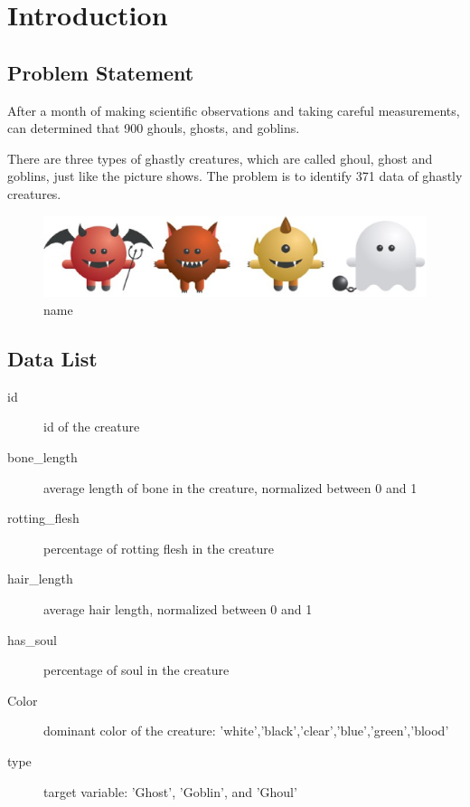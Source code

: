 
\section{Introduction}\label{sec-intro}

\subsection{Problem Statement}
After a month of making scientific observations 
and taking careful measurements, 
can determined that 900 ghouls, ghosts, and goblins.



There are three types of ghastly creatures, which are called ghoul, ghost and goblins, just like the picture shows. The problem is to identify 371 data of ghastly creatures. 


\begin{figure}[htbp]\centering
	\includegraphics[scale=0.3]{figures/bar.eps}
	\caption{name}
\end{figure}


\subsection{Data List}

\begin{description}
	\item[id] id of the creature
	\item[bone_length] average length of bone in the creature, normalized between 0 and 1
	\item[rotting_flesh] percentage of rotting flesh in the creature
	\item[hair_length] average hair length, normalized between 0 and 1
	\item[has_soul] percentage of soul in the creature
	\item[Color] dominant color of the creature: 'white','black','clear','blue','green','blood'
	\item[type] target variable: 'Ghost', 'Goblin', and 'Ghoul'
\end{description}

